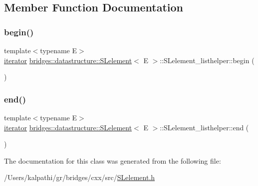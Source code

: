 \subsection{Member Function Documentation}
\mbox{\label{classbridges_1_1datastructure_1_1_s_lelement_1_1_s_lelement__listhelper_a9bc74da8d0ae6cfc9506ea9480c33a15}} 
\subsubsection{\texorpdfstring{begin()}{begin()}}
{\footnotesize\ttfamily template$<$typename E$>$ \\
\mbox{\hyperlink{classbridges_1_1datastructure_1_1_s_lelement_1_1_s_lelement__listhelper_1_1iterator}{iterator}} \mbox{\hyperlink{classbridges_1_1datastructure_1_1_s_lelement}{bridges\+::datastructure\+::\+S\+Lelement}}$<$ E $>$\+::S\+Lelement\+\_\+listhelper\+::begin (\begin{DoxyParamCaption}{ }\end{DoxyParamCaption})\hspace{0.3cm}{\ttfamily [inline]}}

\mbox{\label{classbridges_1_1datastructure_1_1_s_lelement_1_1_s_lelement__listhelper_aecbbc35682d82fa86a746b9a588525d0}} 
\subsubsection{\texorpdfstring{end()}{end()}}
{\footnotesize\ttfamily template$<$typename E$>$ \\
\mbox{\hyperlink{classbridges_1_1datastructure_1_1_s_lelement_1_1_s_lelement__listhelper_1_1iterator}{iterator}} \mbox{\hyperlink{classbridges_1_1datastructure_1_1_s_lelement}{bridges\+::datastructure\+::\+S\+Lelement}}$<$ E $>$\+::S\+Lelement\+\_\+listhelper\+::end (\begin{DoxyParamCaption}{ }\end{DoxyParamCaption})\hspace{0.3cm}{\ttfamily [inline]}}



The documentation for this class was generated from the following file\+:\begin{DoxyCompactItemize}
\item 
/\+Users/kalpathi/gr/bridges/cxx/src/\mbox{\hyperlink{_s_lelement_8h}{S\+Lelement.\+h}}\end{DoxyCompactItemize}
